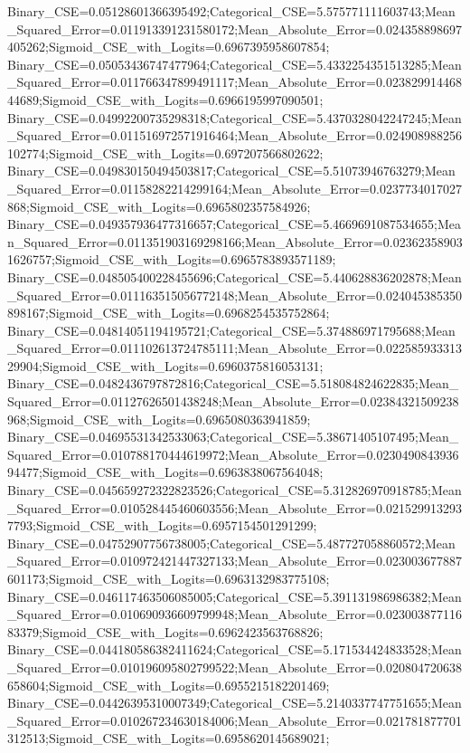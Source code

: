 Binary_CSE=0.05128601366395492;Categorical_CSE=5.575771111603743;Mean_Squared_Error=0.011913391231580172;Mean_Absolute_Error=0.024358898697405262;Sigmoid_CSE_with_Logits=0.6967395958607854;
Binary_CSE=0.05053436747477964;Categorical_CSE=5.4332254351513285;Mean_Squared_Error=0.011766347899491117;Mean_Absolute_Error=0.02382991446844689;Sigmoid_CSE_with_Logits=0.6966195997090501;
Binary_CSE=0.04992200735298318;Categorical_CSE=5.4370328042247245;Mean_Squared_Error=0.011516972571916464;Mean_Absolute_Error=0.024908988256102774;Sigmoid_CSE_with_Logits=0.697207566802622;
Binary_CSE=0.049830150494503817;Categorical_CSE=5.51073946763279;Mean_Squared_Error=0.01158282214299164;Mean_Absolute_Error=0.0237734017027868;Sigmoid_CSE_with_Logits=0.6965802357584926;
Binary_CSE=0.049357936477316657;Categorical_CSE=5.4669691087534655;Mean_Squared_Error=0.011351903169298166;Mean_Absolute_Error=0.023623589031626757;Sigmoid_CSE_with_Logits=0.6965783893571189;
Binary_CSE=0.048505400228455696;Categorical_CSE=5.440628836202878;Mean_Squared_Error=0.011163515056772148;Mean_Absolute_Error=0.024045385350898167;Sigmoid_CSE_with_Logits=0.6968254535752864;
Binary_CSE=0.04814051194195721;Categorical_CSE=5.374886971795688;Mean_Squared_Error=0.011102613724785111;Mean_Absolute_Error=0.02258593331329904;Sigmoid_CSE_with_Logits=0.6960375816053131;
Binary_CSE=0.0482436797872816;Categorical_CSE=5.518084824622835;Mean_Squared_Error=0.01127626501438248;Mean_Absolute_Error=0.02384321509238968;Sigmoid_CSE_with_Logits=0.6965080363941859;
Binary_CSE=0.04695531342533063;Categorical_CSE=5.38671405107495;Mean_Squared_Error=0.010788170444619972;Mean_Absolute_Error=0.023049084393694477;Sigmoid_CSE_with_Logits=0.6963838067564048;
Binary_CSE=0.045659272322823526;Categorical_CSE=5.312826970918785;Mean_Squared_Error=0.010528445460603556;Mean_Absolute_Error=0.0215299132937793;Sigmoid_CSE_with_Logits=0.6957154501291299;
Binary_CSE=0.04752907756738005;Categorical_CSE=5.487727058860572;Mean_Squared_Error=0.010972421447327133;Mean_Absolute_Error=0.023003677887601173;Sigmoid_CSE_with_Logits=0.6963132983775108;
Binary_CSE=0.046117463506085005;Categorical_CSE=5.391131986986382;Mean_Squared_Error=0.010690936609799948;Mean_Absolute_Error=0.02300387711683379;Sigmoid_CSE_with_Logits=0.6962423563768826;
Binary_CSE=0.044180586382411624;Categorical_CSE=5.171534424833528;Mean_Squared_Error=0.010196095802799522;Mean_Absolute_Error=0.020804720638658604;Sigmoid_CSE_with_Logits=0.6955215182201469;
Binary_CSE=0.04426395310007349;Categorical_CSE=5.2140337747751655;Mean_Squared_Error=0.010267234630184006;Mean_Absolute_Error=0.021781877701312513;Sigmoid_CSE_with_Logits=0.6958620145689021;
